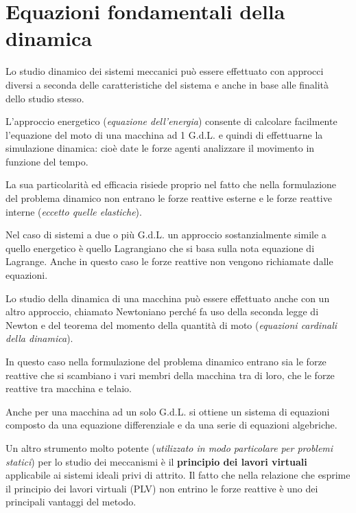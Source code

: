 \chapter{Equazioni fondamentali della dinamica}
	
	Lo studio dinamico dei sistemi meccanici può essere effettuato con approcci diversi a seconda delle caratteristiche del sistema e anche in base alle finalità dello studio stesso.\newline
	
	L'approccio energetico (\emph{equazione dell'energia}) consente di calcolare facilmente l'equazione del moto di una macchina ad 1 G.d.L. e quindi di effettuarne la simulazione dinamica: cioè date le forze agenti analizzare il movimento in funzione del tempo.
	
	La sua particolarità ed efficacia risiede proprio nel fatto che nella formulazione del problema dinamico non entrano le forze reattive esterne e le forze reattive interne (\emph{eccetto quelle elastiche}).
	
	Nel caso di sistemi a due o più G.d.L. un approccio sostanzialmente simile a quello energetico è quello Lagrangiano che si basa sulla nota equazione di Lagrange. Anche in questo caso le forze reattive non vengono richiamate dalle equazioni.\newline
	
	Lo studio della dinamica di una macchina può essere effettuato anche con un altro approccio, chiamato Newtoniano perché fa uso della seconda legge di Newton e del teorema del momento della quantità di moto (\emph{equazioni cardinali della dinamica}).
	
	In questo caso nella formulazione del problema dinamico entrano sia le forze reattive che si scambiano i vari membri della macchina tra di loro, che le forze reattive tra macchina e telaio.

Anche per una macchina ad un solo G.d.L. si ottiene un sistema di equazioni composto da una equazione differenziale e da una serie di equazioni algebriche.\newline

Un altro strumento molto potente (\emph{utilizzato in modo particolare per problemi statici}) per lo studio dei meccanismi è il \textbf{principio dei lavori virtuali} applicabile ai sistemi ideali privi di attrito. Il fatto che nella relazione che esprime il principio dei lavori virtuali (PLV) non entrino le forze reattive è uno dei principali vantaggi del metodo.\newline

